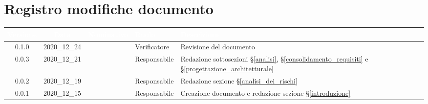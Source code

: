 \section*{Registro modifiche documento}
{
\renewcommand{\arraystretch}{1.5}
\centering
\begin{longtable}{ c c  C{2.3cm} C{3cm} C{3.2cm}}


 \textcolor{white}{\textbf{Versione}}&
    \textcolor{white}{\textbf{Data}}&
    \textcolor{white}{\textbf{Nominativo}}&
    \textcolor{white}{\textbf{Ruolo}}&
    \textcolor{white}{\textbf{Descrizione}}\\	
    \endhead

    0.1.0 & 2020\_12\_24 & \PC{} & Verificatore & Revisione del documento\\

    0.0.3 & 2020\_12\_21 & \MM{} & Responsabile & Redazione sottosezioni \S\ref{analisi}, \S\ref{consolidamento_requisiti} e \S\ref{progettazione_architetturale} \\

    0.0.2 & 2020\_12\_19 & \MM{} & Responsabile & Redazione sezione \S\ref{analisi_dei_rischi}\\

    0.0.1 & 2020\_12\_15 & \MM{} & Responsabile & Creazione documento e redazione sezione \S\ref{introduzione}
			
\end{longtable}
}